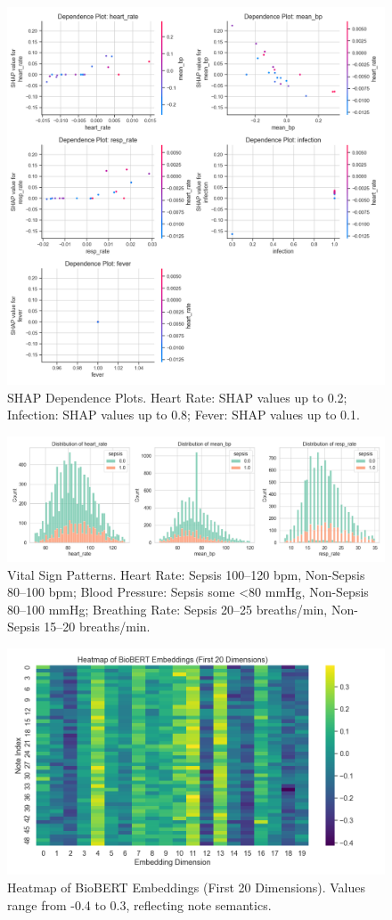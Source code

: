 \documentclass[journal]{IEEEtran}
\begin{document}
\begin{figure}[H]
    \centering
    \includegraphics[width=0.8\columnwidth]{shap_dependence_combined.png}
    \caption{SHAP Dependence Plots. Heart Rate: SHAP values up to 0.2; Infection: SHAP values up to 0.8; Fever: SHAP values up to 0.1.}
    \label{fig:shap}
\end{figure}

\begin{figure}[H]
    \centering
    \includegraphics[width=0.8\columnwidth]{feature_distributions.png}
    \caption{Vital Sign Patterns. Heart Rate: Sepsis 100–120 bpm, Non-Sepsis 80–100 bpm; Blood Pressure: Sepsis some <80 mmHg, Non-Sepsis 80–100 mmHg; Breathing Rate: Sepsis 20–25 breaths/min, Non-Sepsis 15–20 breaths/min.}
    \label{fig:dist}
\end{figure}

\begin{figure}[H]
    \centering
    \includegraphics[width=0.8\columnwidth]{biobert_heatmap.png}
    \caption{Heatmap of BioBERT Embeddings (First 20 Dimensions). Values range from -0.4 to 0.3, reflecting note semantics.}
    \label{fig:biobert_heatmap}
\end{figure}
\end{document}
